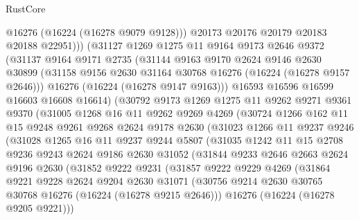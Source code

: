\begin{lexlean}{RustCore}
\begin{coremodule}
              @16276
              (@16224 (@16278 @9079 @9128)))
            @20173
            @20176
            @20179
            @20183
            @20188
            @22951)))
      (@31127
        @1269
        @1275
        @11
        @9164
        @9173
        @2646
        @9372
        (@31137
          @9164
          @9171
          @2735
          (@31144
            @9163
            @9170
            @2624
            @9146
            @2630
            @30899
            (@31158 @9156 @2630 @31164 @30768 @16276 (@16224 (@16278 @9157 @2646)))
            @16276
            (@16224 (@16278 @9147 @9163)))
          @16593
          @16596
          @16599
          @16603
          @16608
          @16614)
        (@30792
          @9173
          @1269
          @1275
          @11
          @9262
          @9271
          @9361
          @9370
          (@31005
            @1268
            @16
            @11
            @9262
            @9269
            @4269
            (@30724
              @1266
              @162
              @11
              @15
              @9248
              @9261
              @9268
              @2624
              @9178
              @2630
              (@31023
                @1266
                @11
                @9237
                @9246
                (@31028
                  @1265
                  @16
                  @11
                  @9237
                  @9244
                  @5807
                  (@31035
                    @1242
                    @11
                    @15
                    @2708
                    @9236
                    @9243
                    @2624
                    @9186
                    @2630
                    @31052
                    (@31844
                      @9233
                      @2646
                      @2663
                      @2624
                      @9196
                      @2630
                      (@31852
                        @9222
                        @9231
                        (@31857
                          @9222
                          @9229
                          @4269
                          (@31864
                            @9221
                            @9228
                            @2624
                            @9204
                            @2630
                            @31071
                            (@30756 @9214 @2630 @30765 @30768 @16276 (@16224 (@16278 @9215 @2646)))
                            @16276
                            (@16224 (@16278 @9205 @9221)))

\end{coremodule}
\end{lexlean}
